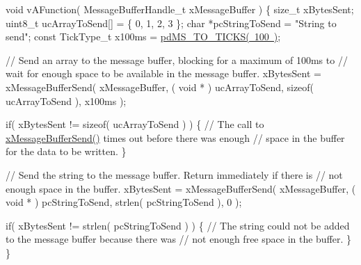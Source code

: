 \begin{DoxyPre}
\begin{DoxyPre}
\begin{DoxyPre}
void vAFunction( MessageBufferHandle\_t xMessageBuffer )
\{
size\_t xBytesSent;
uint8\_t ucArrayToSend[] = \{ 0, 1, 2, 3 \};
char *pcStringToSend = "String to send";
const TickType\_t x100ms = \mbox{\hyperlink{projdefs_8h_a353d0f62b82a402cb3db63706c81ec3f}{pdMS\_TO\_TICKS( 100 )}};\end{DoxyPre}
\end{DoxyPre}
\end{DoxyPre}



\begin{DoxyPre}
\begin{DoxyPre}
\begin{DoxyPre}    // Send an array to the message buffer, blocking for a maximum of 100ms to
    // wait for enough space to be available in the message buffer.
    xBytesSent = xMessageBufferSend( xMessageBuffer, ( void * ) ucArrayToSend, sizeof( ucArrayToSend ), x100ms );\end{DoxyPre}
\end{DoxyPre}
\end{DoxyPre}



\begin{DoxyPre}
\begin{DoxyPre}
\begin{DoxyPre}    if( xBytesSent != sizeof( ucArrayToSend ) )
    \{
        // The call to \mbox{\hyperlink{message__buffer_8h_a858f6da6fe24a226c45caf1634ea1605}{xMessageBufferSend()}} times out before there was enough
        // space in the buffer for the data to be written.
    \}\end{DoxyPre}
\end{DoxyPre}
\end{DoxyPre}



\begin{DoxyPre}
\begin{DoxyPre}
\begin{DoxyPre}    // Send the string to the message buffer.  Return immediately if there is
    // not enough space in the buffer.
    xBytesSent = xMessageBufferSend( xMessageBuffer, ( void * ) pcStringToSend, strlen( pcStringToSend ), 0 );\end{DoxyPre}
\end{DoxyPre}
\end{DoxyPre}



\begin{DoxyPre}
\begin{DoxyPre}
\begin{DoxyPre}    if( xBytesSent != strlen( pcStringToSend ) )
    \{
        // The string could not be added to the message buffer because there was
        // not enough free space in the buffer.
    \}
\}
\end{DoxyPre}
 \end{DoxyPre}
\end{DoxyPre}
